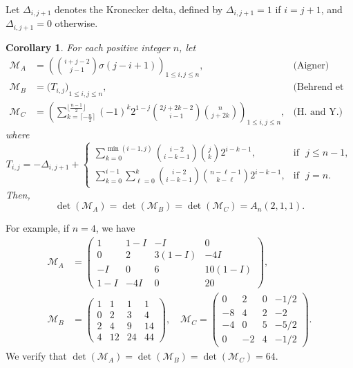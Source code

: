 \documentclass[12pt, a4paper]{amsart} %
\numberwithin{equation}{section}
\newtheorem{corollary}[theorem]{Corollary}
\begin{document}
Let $\Delta_{i,j+1}$ denotes the Kronecker delta, 
  defined by $\Delta_{i,j+1} = 1$ if $i = j+1$, 
  and $\Delta_{i,j+1} = 0$ otherwise.


\begin{corollary}\label{cor:compar} 
For each positive integer $n$, let
\begin{align*}
\mathcal{M}_A &=  {\left(\binom{i+j-2}{j-1}\sigma(j-i+1)\right)}_{1 \leq i,j \leq n},
& \text{(Aigner)}
\\
\mathcal{M}_B &= {\bigl(T_{i,j}\bigr)}_{1 \le i,j \le n},
& \text{(Behrend et al.)}
\\
\mathcal{M}_C &= \left(\sum_{k=\lceil  -\frac{n}{2}\rceil }^{ \lfloor \frac{n-1}{2} \rfloor}
(-1)^{k}2^{1-j}\binom{2j+2k-2}{i-1}\binom{n}{j+2k}\right)_{1\leq i,j\leq n},
& \text{(H. and Y.)}
\end{align*}
where 
$$
 T_{i,j} = -\Delta_{i, j+1} + 
 \begin{cases}
 \displaystyle
 \sum_{k=0}^{\min(i-1, j)} \binom{i-2}{i-k-1} \binom{j}{k} 2^{i-k-1}, & \mbox{if } \,\, j \leq n-1, \\[12pt]
 \displaystyle
 \sum_{k=0}^{i-1} \sum_{\ell=0}^k \binom{i-2}{i-k-1} \binom{n-\ell-1}{k-\ell} 2^{i-k-1}, & \mbox{if } \,\, j = n.
 \end{cases}
$$
Then, 
$$
\det(\mathcal{M}_A)
=\det(\mathcal{M}_B)
=\det(\mathcal{M}_C)=A_n(2,1,1).
$$
\end{corollary}

For example, if $n=4$, we have
\begin{align*}
\mathcal{M}_A &= 
\begin{pmatrix}
1 & 1-I & -I & 0 \\
0 & 2 & 3(1-I) & -4I \\
-I & 0 & 6 & 10(1-I) \\
1-I & -4I & 0 & 20
\end{pmatrix},\\
\mathcal{M}_B &=
\begin{pmatrix}
1 & 1 & 1 & 1 \\
0 & 2 & 3 & 4 \\
2 & 4 & 9 & 14 \\
4 & 12 & 24 & 44
\end{pmatrix},\quad
\mathcal{M}_C =
\begin{pmatrix}
0 & 2 & 0 & -1/2 \\
-8 & 4 & 2 & -2 \\
-4 & 0 & 5 & -5/2 \\
0 & -2 & 4 & -1/2
\end{pmatrix}.
\end{align*}
We verify that $
\det(\mathcal{M}_A)
=\det(\mathcal{M}_B)
=\det(\mathcal{M}_C)
= 64
$.
\end{document}
